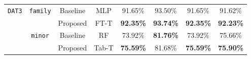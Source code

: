 \begin{table}[h!]
\begin{tabular}{cccccccc}
\multirow{4}{*}{\texttt{DAT3}}  & \multirow{2}{*}{\texttt{family}} & {\cellcolor{my_grey}}Baseline        & {\cellcolor{my_grey}}MLP            & {\cellcolor{my_grey}}91.65\%           & {\cellcolor{my_grey}}93.50\%            & {\cellcolor{my_grey}}91.65\%         & {\cellcolor{my_grey}}91.62\%           \\
\hhline{~~------}
                       &                         & Proposed        & FT-T           & {\cellcolor{my_blue}}\textbf{92.35\%}           & {\cellcolor{my_blue}}\textbf{93.74\%}            & {\cellcolor{my_blue}}\textbf{92.35\%}         & {\cellcolor{my_blue}}\textbf{92.23\%}           \\ 
                       \hhline{~-------}
                       & \multirow{2}{*}{\texttt{minor}}  & {\cellcolor{my_grey}}Baseline        & {\cellcolor{my_grey}}RF            & {\cellcolor{my_grey}}73.92\%           & {\cellcolor{my_blue}}\textbf{81.76\%}            & {\cellcolor{my_grey}}73.92\%         & {\cellcolor{my_grey}}75.66\%           \\
\hhline{~~------}
                       &                         & Proposed        & Tab-T          & {\cellcolor{my_blue}}\textbf{75.59\%}           & 81.68\%            & {\cellcolor{my_blue}}\textbf{75.59\%}         & {\cellcolor{my_blue}}\textbf{75.90\%}           \\ 
\hline \hline
\end{tabular}
\end{table}

\vfill

\clearpage